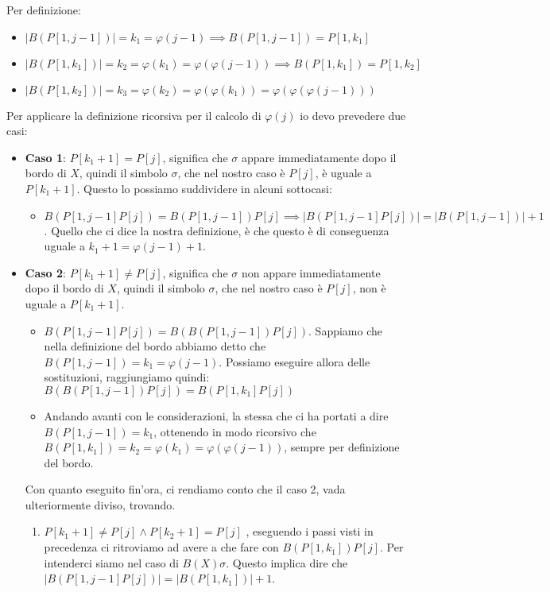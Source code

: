 Per definizione:  
\begin{itemize}
    \item $|B(P[1,j-1])| = k_1 = \varphi(j-1) \implies B(P[1, j-1]) = P[1, k_1]$
    \item $|B(P[1,k_1])| = k_2 = \varphi(k_1) = \varphi(\varphi(j-1)) \implies B(P[1,k_1]) = P[1, k_2]$
    \item $|B(P[1, k_2])| = k_3 = \varphi(k_2) = \varphi(\varphi(k_1)) = \varphi(\varphi(\varphi(j-1)))$
\end{itemize}
Per applicare la definizione ricorsiva per il calcolo di $\varphi(j)$ io devo prevedere due casi:
\begin{itemize}
    \item \textbf{Caso 1}: $P[k_1 + 1] = P[j]$, significa che $\sigma$ appare immediatamente dopo il bordo di $X$, quindi il simbolo $\sigma$, che nel nostro caso è $P[j]$, è uguale a $P[k_1 + 1]$. Questo lo possiamo suddividere in alcuni sottocasi:
        \begin{itemize}
            \item $B(P[1, j-1] P[j]) = B(P[1, j-1]) P[j] \implies |B(P[1, j-1] P[j])| = |B(P[1, j-1])| +1$. Quello che ci dice la nostra definizione, è che questo è di conseguenza uguale a $k_1 + 1 = \varphi(j-1) + 1$.
        \end{itemize}
    \item \textbf{Caso 2}: $P[k_1 + 1] \neq P[j]$, significa che $\sigma$ non appare immediatamente dopo il bordo di $X$, quindi il simbolo $\sigma$, che nel nostro caso è $P[j]$, non è uguale a $P[k_1 + 1]$.
        \begin{itemize}
            \item $B(P[1, j-1] P[j]) = B(B(P[1, j-1]) P[j])$. Sappiamo che nella definizione del bordo abbiamo detto che $B(P[1, j-1]) = k_1 = \varphi(j-1)$. Possiamo eseguire allora delle sostituzioni, raggiungiamo quindi: $B(B(P[1, j-1]) P[j]) = B(P[1,k_1]P[j])$
            \item Andando avanti con le considerazioni, la stessa che ci ha portati a dire  $B(P[1, j-1]) = k_1$, ottenendo in modo ricorsivo che  $B(P[1, k_1]) = k_2 = \varphi(k_1) = \varphi(\varphi(j-1))$, sempre per definizione del bordo. 
        \end{itemize}
        Con quanto eseguito fin'ora, ci rendiamo conto che il caso 2, vada ulteriormente diviso, trovando.
        \begin{enumerate}
            \item $P[k_1 + 1] \neq P[j] \land P[k_2 + 1] = P[j]$ , eseguendo i passi visti in precedenza ci ritroviamo ad avere a che fare con $B(P[1, k_1])P[j]$. Per intenderci siamo nel caso di $B(X)\sigma$. Questo implica dire che $|B(P[1, j-1] P[j])| = |B(P[1, k_1])| + 1 $.\\

\end{enumerate}
\end{itemize}
